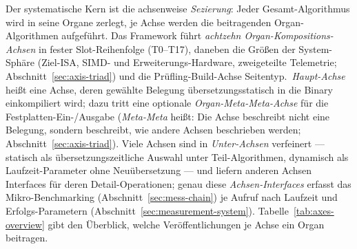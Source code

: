 \begin{nurkurz}
Der systematische Kern ist die achsenweise \emph{Sezierung}: Jeder Gesamt-Algorithmus wird in seine Organe
zerlegt, je Achse werden die beitragenden Organ-Algorithmen aufgeführt. Das Framework führt \emph{achtzehn
Organ-Kompositions-Achsen} in fester Slot-Reihenfolge (T0--T17), daneben die Größen der System-Sphäre (Ziel-ISA,
SIMD- und Erweiterungs-Hardware, zweigeteilte Telemetrie; Abschnitt~\ref{sec:axis-triad}) und die
Prüfling-Build-Achse Seitentyp.\ \emph{Haupt-Achse} heißt eine Achse, deren gewählte Belegung
übersetzungsstatisch in die Binary einkompiliert wird; dazu tritt eine optionale \emph{Organ-Meta-Meta-Achse} für
die Festplatten-Ein-/Ausgabe (\emph{Meta-Meta} heißt: Die Achse beschreibt nicht eine Belegung, sondern
beschreibt, wie andere Achsen beschrieben werden; Abschnitt~\ref{sec:axis-triad}). Viele Achsen sind in
\emph{Unter-Achsen} verfeinert --- statisch als übersetzungszeitliche Auswahl unter Teil-Algorithmen, dynamisch
als Laufzeit-Parameter ohne Neuübersetzung --- und liefern anderen Achsen Interfaces für deren
Detail-Operationen; genau diese \emph{Achsen-Interfaces} erfasst das Mikro-Benchmarking
(Abschnitt~\ref{sec:mess-chain}) je Aufruf nach Laufzeit und Erfolgs-Parametern
(Abschnitt~\ref{sec:measurement-system}). Tabelle~\ref{tab:axes-overview} gibt den Überblick, welche
Veröffentlichungen je Achse ein Organ beitragen.
\end{nurkurz}


